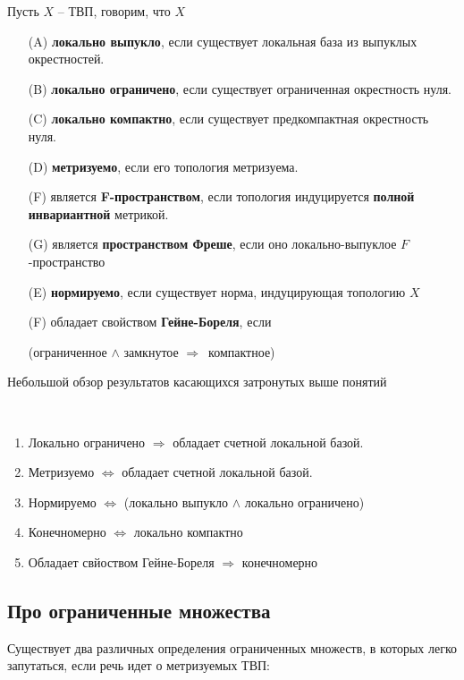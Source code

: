 \documentclass[12pt, a4paper, oneside]{book}
\begin{document}
\begin{definition}
    Пусть $X$ -- ТВП, говорим, что $X$
    \begin{enumerate}
        \item[(A)] \textbf{локально выпукло}, если существует локальная база из выпуклых окрестностей.
        \item[(B)] \textbf{локально ограничено}, если существует ограниченная окрестность нуля.
        \item[(C)] \textbf{локально компактно}, если существует предкомпактная окрестность нуля.
        \item[(D)] \textbf{метризуемо}, если его топология метризуема.
        \item[(F)] является \textbf{F-пространством}, если топология индуцируется \textbf{полной инвариантной} метрикой.
        \item[(G)] является \textbf{пространством Фреше}, если оно локально-выпуклое $F$-пространство
        \item[(E)] \textbf{нормируемо}, если существует норма, индуцирующая топологию $X$
        \item[(F)] обладает свойством \textbf{Гейне-Бореля}, если
        \begin{center}(ограниченное $\wedge$ замкнутое $\Rightarrow\,$ компактное)
            \end{center}
    \end{enumerate}
\end{definition}

Небольшой обзор результатов касающихся затронутых выше понятий
\begin{theorem}\ \\
\begin{enumerate}
    \item Локально ограничено $\Rightarrow$ обладает счетной локальной базой.
    \item Метризуемо $\Leftrightarrow$ обладает счетной локальной базой.
    \item Нормируемо $\Leftrightarrow$ (локально выпукло $\wedge$ локально ограничено)
    \item Конечномерно  $\Leftrightarrow$ локально компактно
    \item Обладает свйоством Гейне-Бореля $\Rightarrow$ конечномерно
\end{enumerate}
\end{theorem}

\subsection{Про ограниченные множества}
Существует два различных определения ограниченных множеств, в которых легко запутаться, если речь идет о метризуемых ТВП:
\end{document}
